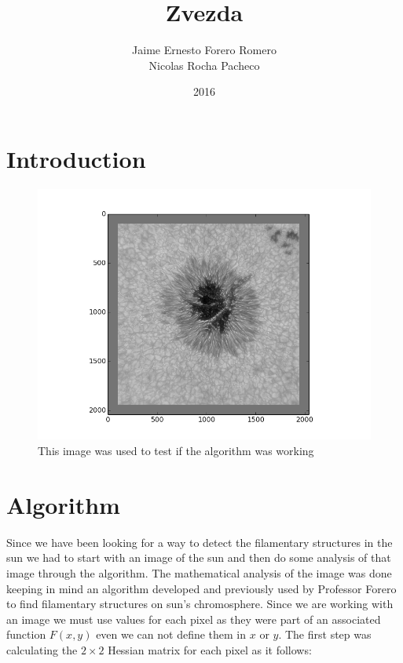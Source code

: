 \documentclass{article}
\title{Zvezda}
\author{Jaime Ernesto Forero Romero \\ Nicolas Rocha Pacheco}
\date{2016}
\begin{document}
\graphicspath{ {images/} }

\maketitle
\tableofcontents
\listoffigures

\section{Introduction}

\begin{figure}[H]
    \centering
    \includegraphics[width=\textwidth]{original}
    \caption{This image was used to test if the algorithm was working}
    \label{image}
\end{figure}

\section{Algorithm}



Since we have been looking for a way to detect the filamentary structures in the sun we had to start with an image of the sun and then do some analysis of that image through the algorithm. The mathematical analysis of the image was done keeping in mind an algorithm developed and previously used by Professor Forero to find filamentary structures on sun’s chromosphere. Since we are working with an image we must use values for each pixel as they were part of an associated function $F(x,y)$ even we can not define them in $x$ or $y$.
The first step was calculating the $2\times2$ Hessian matrix for each pixel as it follows:
\end{document}
